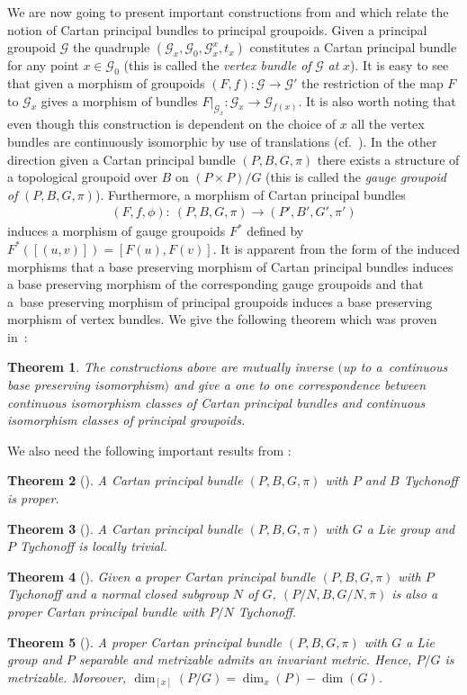 \documentclass[pdftex]{sigma}
\newtheorem{tw}{Theorem}[section]
\begin{document}
We are now going to present important constructions from \cite{McK1} and \cite{McK2} which relate the notion of Cartan principal bundles to principal groupoids. Given a principal groupoid $\mathcal{G}$ the quadruple $(\mathcal{G}_x,\mathcal{G}_0,\mathcal{G}^x_x,t_x)$ constitutes a Cartan principal bundle for any point $x\in\mathcal{G}_0$ (this is called the \emph{vertex bundle of} $\mathcal{G}$ \emph{at} $x$). It is easy to see that given a morphism of groupoids $(F,f)\colon \mathcal{G}\rightarrow\mathcal{G}'$ the restriction of the map $F$ to $\mathcal{G}_x$ gives a morphism of bundles $F|_{\mathcal{G}_x}\colon \mathcal{G}_x\rightarrow\mathcal{G}_{f(x)}$. It is also worth noting that even though this construction is dependent on the choice of $x$ all the vertex bundles are continuously isomorphic by use of translations (cf.~\cite{McK1}). In the other direction given a Cartan principal bundle $(P,B,G,\pi)$ there exists a structure of a topological groupoid over $B$ on $(P\times P)\slash G$ (this is called the \emph{gauge groupoid of} $(P,B,G,\pi)$). Furthermore, a morphism of Cartan principal bundles
\begin{gather*}(F,f,\phi)\colon \ (P,B,G,\pi)\rightarrow (P',B',G',\pi')
\end{gather*} induces a morphism of gauge groupoids $F^*$ defined by $F^*([(u,v)])=[F(u),F(v)]$. It is apparent from the form of the induced morphisms that a base preserving morphism of Cartan principal bundles induces a base preserving morphism of the corresponding gauge groupoids and that a~base preserving morphism of principal groupoids induces a base preserving morphism of vertex bundles. We give the following theorem which was proven in~\cite{McK1}:
\begin{tw}\label{CPB} The constructions above are mutually inverse $($up to a~continuous base preserving isomorphism$)$ and give a one to one correspondence between continuous isomorphism classes of Cartan principal bundles and continuous isomorphism classes of principal groupoids.
\end{tw}
We also need the following important results from \cite{P}:
\begin{tw}[{\cite[Proposition 1.2.5]{P}}]\label{Slice2} A Cartan principal bundle $(P,B,G,\pi)$ with $P$ and $B$ Tychonoff is proper.
\end{tw}
\begin{tw}[{\cite[Section 4.1]{P}}]\label{Slice} A Cartan principal bundle $(P,B,G,\pi)$ with $G$ a Lie group and $P$ Tychonoff is locally trivial.
\end{tw}
\begin{tw}[{\cite[Proposition 1.3.2]{P}}] \label{Slice4} Given a proper Cartan principal bundle $(P,B,G,\pi)$ with $P$ Tychonoff and a normal closed subgroup $N$ of $G$, $(P\slash N,B,G\slash N,\overline{\pi})$ is also a proper Cartan principal bundle with $P\slash N$ Tychonoff.
\end{tw}
\begin{tw}[{\cite[Theorem 4.3.4]{P}}]\label{Slice3} A proper Cartan principal bundle $(P,B,G,\pi)$ with $G$ a Lie group and $P$ separable and metrizable admits an invariant metric. Hence, $P\slash G$ is metrizable. Moreover, $\dim_{[x]}(P\slash G)=\dim_x(P)-\dim(G)$.
\end{tw}
\end{document}
